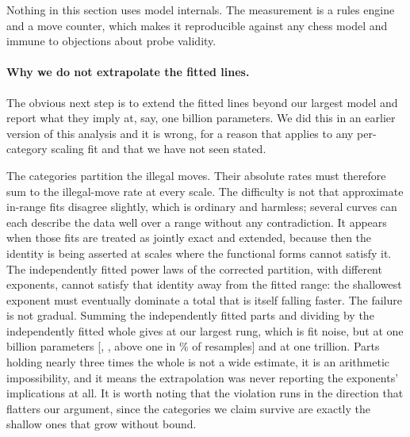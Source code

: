 \documentclass[11pt]{article}
\begin{document}
Nothing in this section uses model internals. The measurement is a rules engine
and a move counter, which makes it reproducible against any chess model and immune
to objections about probe validity.

\paragraph{Why we do not extrapolate the fitted lines.}
The obvious next step is to extend the fitted lines beyond our largest model and
report what they imply at, say, one billion parameters. We did this in an earlier
version of this analysis and it is wrong, for a reason that applies to any
per-category scaling fit and that we have not seen stated.

The categories partition the illegal moves. Their absolute rates must therefore sum
to the illegal-move rate at every scale. The difficulty is not that approximate
in-range fits disagree slightly, which is ordinary and harmless; several curves can
each describe the data well over a range without any contradiction. It appears when
those fits are treated as jointly exact and extended, because then the identity is
being asserted at scales where the functional forms cannot satisfy it. The  independently fitted
power laws of the corrected partition, with  different exponents, cannot
satisfy that identity away from the fitted
range: the shallowest exponent must eventually dominate a total that is itself
falling faster. The failure is not gradual. Summing the independently fitted parts
and dividing by the independently fitted whole gives  at our
largest rung, which is fit noise, but  at one billion parameters
[, , above one in
\% of resamples] and  at one trillion.
Parts holding nearly three times the whole is not a wide estimate, it is an
arithmetic impossibility, and it means the extrapolation was never reporting the
exponents' implications at all. It is worth noting that the violation runs in the
direction that flatters our argument, since the categories we claim survive are
exactly the shallow ones that grow without bound.
\end{document}
